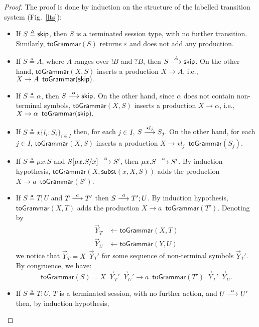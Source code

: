 \begin{proof}
The proof is done by induction on the structure of the labelled 
transition system (Fig.~\ref{lts}):
\begin{itemize}
	\item If $S\triangleq \skipk$, then $S$ is a terminated 
	      session type, with no further transition. Similarly, 
	      $\mathsf{toGrammar}(S)$ returns $\varepsilon$ and 
	      does not add any production.
	\item If $S\triangleq A$, where $A$ ranges over $!B$ and $?B$, 
	      then $S  \LTSderives[A] \skipk$. On the other hand, 
	      $\mathsf{toGrammar}(X,S)$ inserts a production $X\rightarrow A$, 
	      i.e., $X\rightarrow A \enspace  \mathsf{toGrammar}(\skipk).$  
	\item If $S \triangleq \alpha$, then $S   \LTSderives[\alpha] \skipk$. 
	      On the other hand, since $\alpha$ does not contain non-terminal 
	      symbols, $\mathsf{toGrammar}(X,S)$ inserts a production 
	      $X\rightarrow \alpha$, i.e.,  $X\rightarrow \alpha \enspace 
	      \mathsf{toGrammar}(\skipk).$
	\item If $S\triangleq \star\{l_i\colon S_i\}_{i\in I}$ then, for each 
          $j\in I$, $S \LTSderives[\star l_j] S_j$. On the other hand, 
          for each $j\in I$, $\mathsf{toGrammar}(X,S)$ inserts a production 
          $X\rightarrow \star l_j \enspace \mathsf{toGrammar}(S_j)$.
	\item If $S\triangleq \mu x.S$ and $S[\mu x.S/x] \LTSderives[a] S'$, 
	      then $\mu x.S \LTSderives[a] S'$. By induction hypothesis, 
	      $\mathsf{toGrammar}(X,\mathsf{subst}(x,X,S))$ adds the production 
	      $X \rightarrow a\enspace  \mathsf{toGrammar}(S')$.
	\item If $S\triangleq T;U$ and $T \LTSderives[a] T'$ then $S \LTSderives[a] T';U$. 
	      By induction hypothesis, $\mathsf{toGrammar}(X,T)$ adds the production 
	      $X\rightarrow a \enspace \mathsf{toGrammar}(T')$.
		Denoting by 
		\begin{align*}
			\vec Y_T &\leftarrow \mathsf{toGrammar}(X,T)\\
			\vec Y_U &\leftarrow \mathsf{toGrammar}(Y,U)
		\end{align*}
		we notice that $\vec Y_T = X \enspace \vec Y_T'$ for some 
		sequence of non-terminal symbols $\vec Y_T'$. By congruence, we have: 
		\[\mathsf{toGrammar}(S) = X \enspace \vec Y_T' \enspace \vec Y_U' 
		\rightarrow a \enspace \mathsf{toGrammar}(T') \enspace \vec  Y_T' 
		\enspace \vec Y_U.\]
	\item If $S\triangleq T;U$, $T$ is a terminated session, with no further 
	      action, and $U \LTSderives[a] U'$ then, by induction hypothesis, 
	

\end{itemize}
\end{proof}
